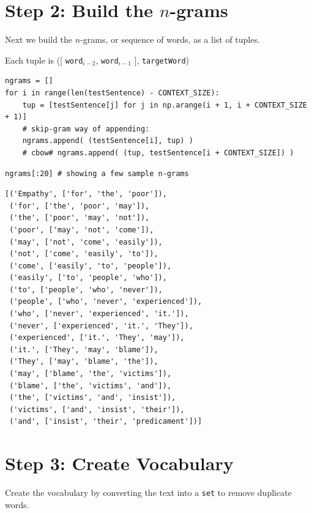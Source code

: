 \documentclass[
]{article}
\begin{document}
\hypertarget{step-2-build-the-n-grams}{%
\section{\texorpdfstring{Step 2: Build the
\(n\)-grams}{Step 2: Build the n-grams}}\label{step-2-build-the-n-grams}}

Next we build the \(n\)-grams, or sequence of words, as a list of
tuples.

Each tuple is ({[} \texttt{word}\(_{i-2}\), \texttt{word}\(_{i-1}\) {]},
\texttt{targetWord})

\begin{verbatim}
ngrams = []
for i in range(len(testSentence) - CONTEXT_SIZE):
    tup = [testSentence[j] for j in np.arange(i + 1, i + CONTEXT_SIZE + 1)]
    # skip-gram way of appending:
    ngrams.append( (testSentence[i], tup) )
    # cbow# ngrams.append( (tup, testSentence[i + CONTEXT_SIZE]) )
\end{verbatim}

\begin{verbatim}
ngrams[:20] # showing a few sample n-grams
\end{verbatim}

\begin{verbatim}
[('Empathy', ['for', 'the', 'poor']),
 ('for', ['the', 'poor', 'may']),
 ('the', ['poor', 'may', 'not']),
 ('poor', ['may', 'not', 'come']),
 ('may', ['not', 'come', 'easily']),
 ('not', ['come', 'easily', 'to']),
 ('come', ['easily', 'to', 'people']),
 ('easily', ['to', 'people', 'who']),
 ('to', ['people', 'who', 'never']),
 ('people', ['who', 'never', 'experienced']),
 ('who', ['never', 'experienced', 'it.']),
 ('never', ['experienced', 'it.', 'They']),
 ('experienced', ['it.', 'They', 'may']),
 ('it.', ['They', 'may', 'blame']),
 ('They', ['may', 'blame', 'the']),
 ('may', ['blame', 'the', 'victims']),
 ('blame', ['the', 'victims', 'and']),
 ('the', ['victims', 'and', 'insist']),
 ('victims', ['and', 'insist', 'their']),
 ('and', ['insist', 'their', 'predicament'])]
\end{verbatim}

\hypertarget{step-3-create-vocabulary}{%
\section{Step 3: Create Vocabulary}\label{step-3-create-vocabulary}}

Create the vocabulary by converting the text into a \texttt{set} to
remove duplicate words.
\end{document}
